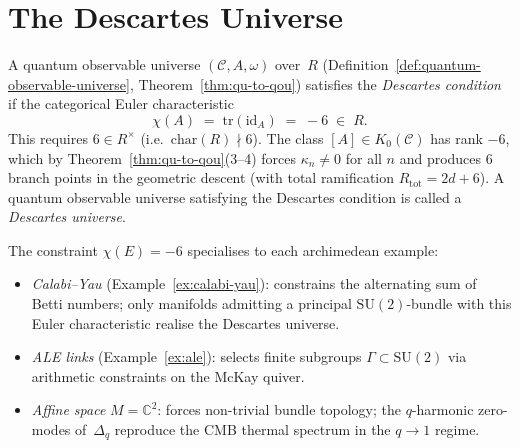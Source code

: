 \chapter{The Descartes Universe}
\label{chap:descartes}


\begin{definition}
\label{def:descartes-condition}
A quantum observable universe $(\mathcal{C}, A, \omega)$ over~$R$
(Definition~\ref{def:quantum-observable-universe},
Theorem~\ref{thm:qu-to-qou}) satisfies the \emph{Descartes condition} if the
categorical Euler characteristic
\[
  \chi(A) \;=\; \mathrm{tr}(\mathrm{id}_A) \;=\; -6 \;\in\; R.
\]
This requires $6 \in R^{\times}$ (i.e.\ $\mathrm{char}(R) \nmid 6$).  The
class $[A] \in K_0(\mathcal{C})$ has rank $-6$, which by
Theorem~\ref{thm:qu-to-qou}(3--4) forces $\kappa_n \neq 0$ for all $n$ and
produces $6$ branch points in the geometric descent (with total ramification
$R_{\mathrm{tot}} = 2d + 6$).  A quantum observable universe satisfying the
Descartes condition is called a \emph{Descartes universe}.
\end{definition}


\begin{remark}
\label{rem:descartes-calabi-yau}
\label{rem:descartes-ale}
\label{rem:descartes-affine}
The constraint $\chi(E) = -6$ specialises to each archimedean example:
\begin{itemize}
  \item \emph{Calabi--Yau} (Example~\ref{ex:calabi-yau}): constrains
        the alternating sum of Betti numbers; only manifolds admitting
        a principal $\mathrm{SU}(2)$-bundle with this Euler characteristic
        realise the Descartes universe.
  \item \emph{ALE links} (Example~\ref{ex:ale}): selects finite subgroups
        $\Gamma \subset \mathrm{SU}(2)$ via arithmetic constraints on
        the McKay quiver.
  \item \emph{Affine space} $M = \mathbb{C}^2$: forces non-trivial
        bundle topology; the $q$-harmonic zero-modes of~$\Delta_q$
        reproduce the CMB thermal spectrum in the $q \to 1$ regime.
\end{itemize}
\end{remark}

